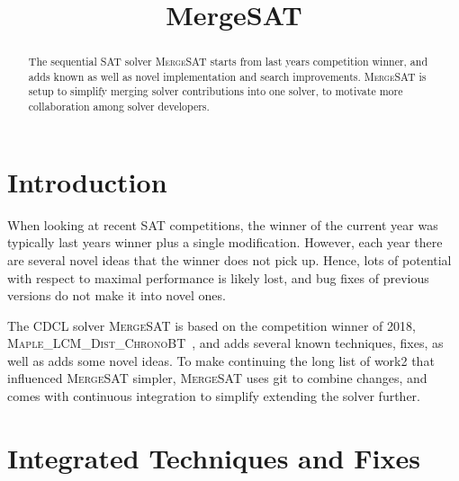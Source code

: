 \documentclass[conference]{IEEEtran}
\begin{document}
	
\title{MergeSAT}

\author{
}

\maketitle

\def\coprocessor{\textsc{Coprocessor}\xspace}
\def\glucose{\textsc{Glucose~2.2}\xspace}
\def\minisat{\textsc{Minisat~2.2}\xspace}
\def\riss{\textsc{Riss}\xspace}
\def\mergesat{\textsc{MergeSAT}\xspace}

\begin{abstract}
The sequential SAT solver \mergesat starts from last years competition winner, and adds known as well as novel implementation and search improvements.
\mergesat is setup to simplify merging solver contributions into one solver, to motivate more collaboration among solver developers.
\end{abstract}

\section{Introduction}

When looking at recent SAT competitions, the winner of the current year was typically last years winner plus a single modification.
However, each year there are several novel ideas that the winner does not pick up.
Hence, lots of potential with respect to maximal performance is likely lost, and bug fixes of previous versions do not make it into novel ones.

The CDCL solver \mergesat is based on the competition winner of 2018, \textsc{Maple\_LCM\_Dist\_ChronoBT}~\cite{MapleLCMDistChronoBT}, and adds several known techniques, fixes, as well as adds some novel ideas.
To make continuing the long list of work2 that influenced \mergesat simpler, \mergesat uses git to combine changes,
and comes with continuous integration to simplify extending the solver further.

\section{Integrated Techniques and Fixes}
\end{document}
